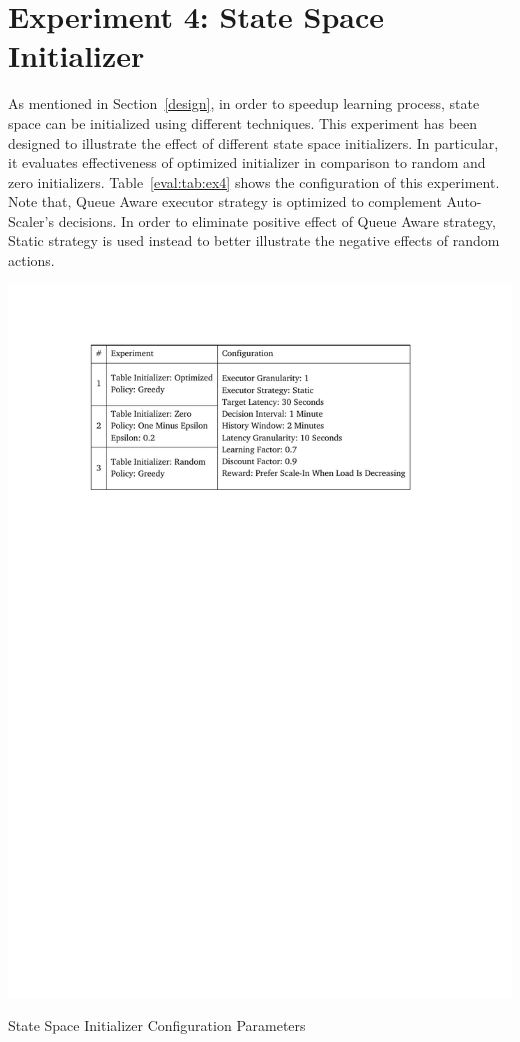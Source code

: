 \section{Experiment 4: State Space Initializer}
As mentioned in Section~\ref{design}, in order to speedup learning process, state space can be initialized using different techniques. This experiment has been designed to illustrate the effect of different state space initializers. In particular, it evaluates effectiveness of optimized initializer in comparison to random and zero initializers. Table~\ref{eval:tab:ex4} shows the configuration of this experiment. Note that, Queue Aware executor strategy is optimized to complement Auto-Scaler's decisions. In order to eliminate positive effect of Queue Aware strategy, Static strategy is used instead to better illustrate the negative effects of random actions.
\begin{table}[h]
    \includegraphics[clip,trim=3.3cm 21.18cm 4.1cm 2.5cm]{tables/ex4.pdf}
    \centering
    \caption{State Space Initializer Configuration Parameters}
    \label{eval:tab:ex4}
\end{table}

